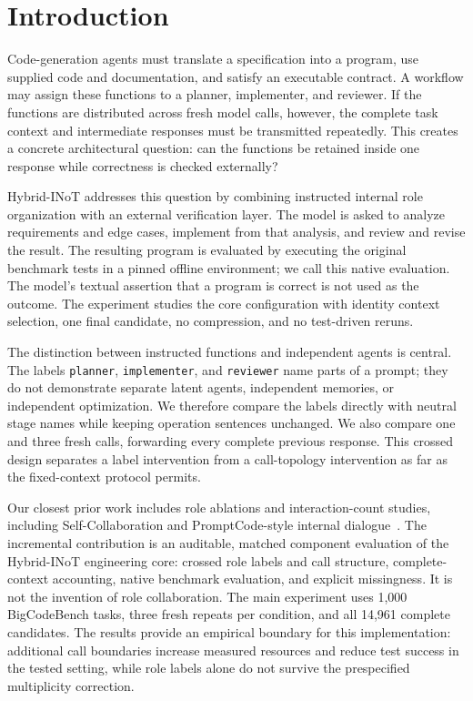 \section{Introduction}
Code-generation agents must translate a specification into a program, use supplied code and documentation, and satisfy an executable contract. A workflow may assign these functions to a planner, implementer, and reviewer. If the functions are distributed across fresh model calls, however, the complete task context and intermediate responses must be transmitted repeatedly. This creates a concrete architectural question: can the functions be retained inside one response while correctness is checked externally?

Hybrid-INoT addresses this question by combining instructed internal role organization with an external verification layer. The model is asked to analyze requirements and edge cases, implement from that analysis, and review and revise the result. The resulting program is evaluated by executing the original benchmark tests in a pinned offline environment; we call this native evaluation. The model's textual assertion that a program is correct is not used as the outcome. The experiment studies the core configuration with identity context selection, one final candidate, no compression, and no test-driven reruns.

The distinction between instructed functions and independent agents is central. The labels \texttt{planner}, \texttt{implementer}, and \texttt{reviewer} name parts of a prompt; they do not demonstrate separate latent agents, independent memories, or independent optimization. We therefore compare the labels directly with neutral stage names while keeping operation sentences unchanged. We also compare one and three fresh calls, forwarding every complete previous response. This crossed design separates a label intervention from a call-topology intervention as far as the fixed-context protocol permits.

Our closest prior work includes role ablations and interaction-count studies, including Self-Collaboration and PromptCode-style internal dialogue~\cite{dong2023selfcollaboration,sun2025inot}. The incremental contribution is an auditable, matched component evaluation of the Hybrid-INoT engineering core: crossed role labels and call structure, complete-context accounting, native benchmark evaluation, and explicit missingness. It is not the invention of role collaboration. The main experiment uses 1,000 BigCodeBench tasks, three fresh repeats per condition, and all 14,961 complete candidates. The results provide an empirical boundary for this implementation: additional call boundaries increase measured resources and reduce test success in the tested setting, while role labels alone do not survive the prespecified multiplicity correction.

